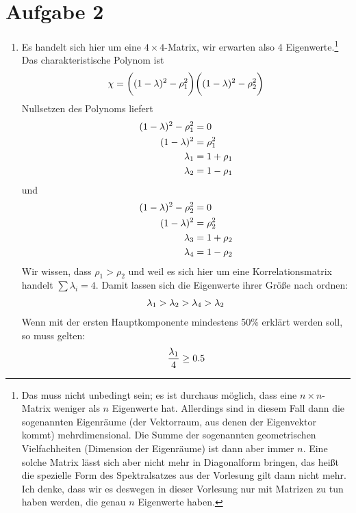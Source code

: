 \documentclass{article}
\begin{document}
	\section*{Aufgabe 2}
	\begin{enumerate}[label=(\alph*)]
		\item Es handelt sich hier um eine $4\times 4$-Matrix, wir erwarten also 4 Eigenwerte.\footnote{Das muss nicht unbedingt sein; es ist durchaus möglich, dass eine $n\times n$-Matrix weniger als $n$ Eigenwerte hat. Allerdings sind in diesem Fall dann die sogenannten Eigenräume (der Vektorraum, aus denen der Eigenvektor kommt) mehrdimensional. Die Summe der sogenannten geometrischen Vielfachheiten (Dimension der Eigenräume) ist dann aber immer $n$. Eine solche Matrix lässt sich aber nicht mehr in Diagonalform bringen, das heißt die spezielle Form des Spektralsatzes aus der Vorlesung gilt dann nicht mehr. Ich denke, dass wir es deswegen in dieser Vorlesung nur mit Matrizen zu tun haben werden, die genau $n$ Eigenwerte haben.} Das charakteristische Polynom ist
		\begin{align}
			\chi = \bigg((1-\lambda)^2 - \rho_1^2\bigg)\bigg((1-\lambda)^2-\rho_2^2\bigg) \notag
		\end{align}
		Nullsetzen des Polynoms liefert
		\begin{align}
			(1-\lambda)^2-\rho_1^2 &= 0 \notag \\
			(1-\lambda)^2 &= \rho_1^2 \notag \\
			\lambda_1 &= 1+\rho_1 \notag \\
			\lambda_2 &= 1-\rho_1 \notag
		\end{align}
		und
		\begin{align}
			(1-\lambda)^2-\rho_2^2 &= 0 \notag \\
			(1-\lambda)^2 &= \rho_2^2 \notag \\
			\lambda_3 &= 1+\rho_2 \notag \\
			\lambda_4 &= 1-\rho_2 \notag
		\end{align}
		Wir wissen, dass $\rho_1>\rho_2$ und weil es sich hier um eine Korrelationsmatrix handelt $\sum \lambda_i=4$. Damit lassen sich die Eigenwerte ihrer Größe nach ordnen:
		\begin{align}
			\lambda_1 > \lambda_2 > \lambda_4 > \lambda_2 \notag
		\end{align}
		Wenn mit der ersten Hauptkomponente mindestens 50\% erklärt werden soll, so muss gelten:
		\begin{align}
			\frac{\lambda_1}{4} &\ge 0.5 \notag \\

\end{align}
\end{enumerate}
\end{document}
